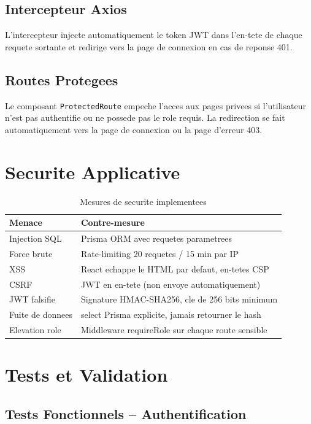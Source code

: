 \documentclass[12pt,a4paper]{report}
\begin{document}
\subsection{Intercepteur Axios}

L'intercepteur injecte automatiquement le token JWT dans l'en-tete de
chaque requete sortante et redirige vers la page de connexion en cas
de reponse 401.

\subsection{Routes Protegees}

Le composant \texttt{ProtectedRoute} empeche l'acces aux pages privees
si l'utilisateur n'est pas authentifie ou ne possede pas le role
requis. La redirection se fait automatiquement vers la page de
connexion ou la page d'erreur 403.

\section{Securite Applicative}

\begin{table}[H]
\centering
\caption{Mesures de securite implementees}
\begin{tabular}{lp{8cm}}
\toprule
\textbf{Menace} & \textbf{Contre-mesure} \\
\midrule
Injection SQL    & Prisma ORM avec requetes parametrees \\
Force brute      & Rate-limiting 20 requetes / 15 min par IP \\
XSS              & React echappe le HTML par defaut, en-tetes CSP \\
CSRF             & JWT en en-tete (non envoye automatiquement) \\
JWT falsifie     & Signature HMAC-SHA256, cle de 256 bits minimum \\
Fuite de donnees & select Prisma explicite, jamais retourner le hash \\
Elevation role   & Middleware requireRole sur chaque route sensible \\
\bottomrule
\end{tabular}
\end{table}

\section{Tests et Validation}

\subsection{Tests Fonctionnels -- Authentification}
\end{document}
